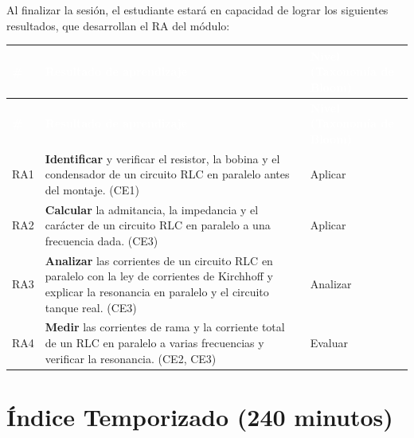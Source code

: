 \documentclass[11pt,letterpaper]{article}
\begin{document}
Al finalizar la sesión, el estudiante estará en capacidad de lograr los siguientes resultados, que desarrollan el RA del módulo:

\begin{xltabular}{\linewidth}{>{\raggedright\arraybackslash}p{1.1cm}>{\raggedright\arraybackslash}X>{\raggedright\arraybackslash}p{3.9cm}}
 \textcolor{white}{\textbf{\#}} & \textcolor{white}{\textbf{Resultado de aprendizaje}} & \textcolor{white}{\textbf{Nivel (Taxonomía de Bloom)}} \\
\endfirsthead
{} \textcolor{white}{\textbf{\#}} & \textcolor{white}{\textbf{Resultado de aprendizaje}} & \textcolor{white}{\textbf{Nivel (Taxonomía de Bloom)}} \\
\endhead
\bottomrule
\endlastfoot
  RA1 & \textbf{Identificar} y verificar el resistor, la bobina y el condensador de un circuito RLC en paralelo antes del montaje. (CE1) & Aplicar \\
   RA2 & \textbf{Calcular} la admitancia, la impedancia y el carácter de un circuito RLC en paralelo a una frecuencia dada. (CE3) & Aplicar \\
  RA3 & \textbf{Analizar} las corrientes de un circuito RLC en paralelo con la ley de corrientes de Kirchhoff y explicar la resonancia en paralelo y el circuito tanque real. (CE3) & Analizar \\
   RA4 & \textbf{Medir} las corrientes de rama y la corriente total de un RLC en paralelo a varias frecuencias y verificar la resonancia. (CE2, CE3) & Evaluar \\
\end{xltabular}

\section{Índice Temporizado (240 minutos)}
\end{document}
